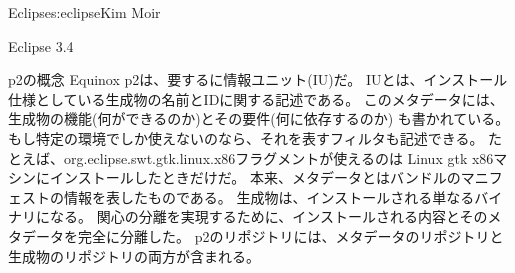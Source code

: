 \begin{aosachapter}{Eclipse}{s:eclipse}{Kim Moir}
\begin{aosasect1}{Eclipse 3.4}
\begin{aosasect2}{p2の概念}
Equinox p2は、要するに情報ユニット(IU)だ。
IUとは、インストール仕様としている生成物の名前とIDに関する記述である。
このメタデータには、生成物の機能(何ができるのか)とその要件(何に依存するのか)
も書かれている。もし特定の環境でしか使えないのなら、それを表すフィルタも記述できる。
たとえば、org.eclipse.swt.gtk.linux.x86フラグメントが使えるのは
Linux gtk x86マシンにインストールしたときだけだ。
本来、メタデータとはバンドルのマニフェストの情報を表したものである。
生成物は、インストールされる単なるバイナリになる。
関心の分離を実現するために、インストールされる内容とそのメタデータを完全に分離した。
p2のリポジトリには、メタデータのリポジトリと生成物のリポジトリの両方が含まれる。



\end{aosasect2}
\end{aosasect1}
\end{aosachapter}
